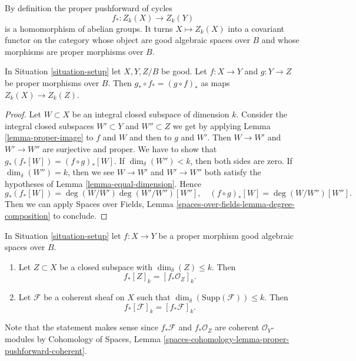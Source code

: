 \noindent
By definition the proper pushforward of cycles
$$
f_* : Z_k(X) \longrightarrow Z_k(Y)
$$
is a homomorphism of abelian groups. It turns $X \mapsto Z_k(X)$
into a covariant functor on the category whose object are good
algebraic spaces over $B$ and whose morphisms are proper morphisms
over $B$.

\begin{lemma}
\label{lemma-compose-pushforward}
In Situation \ref{situation-setup} let $X, Y, Z/B$ be good.
Let $f : X \to Y$ and $g : Y \to Z$ be proper morphisms over $B$.
Then $g_* \circ f_* = (g \circ f)_*$ as maps $Z_k(X) \to Z_k(Z)$.
\end{lemma}

\begin{proof}
Let $W \subset X$ be an integral closed subspace of dimension $k$.
Consider the integral closed subspaces
$W' \subset Y$ and $W'' \subset Z$
we get by applying Lemma \ref{lemma-proper-image}
to $f$ and $W$ and then to $g$ and $W'$.
Then $W \to W'$ and $W' \to W''$ are surjective and proper.
We have to show that $g_*(f_*[W]) = (f \circ g)_*[W]$.
If $\dim_\delta(W'') < k$, then both sides are zero.
If $\dim_\delta(W'') = k$, then we see $W \to W'$ and $W' \to W''$
both satisfy the hypotheses of Lemma \ref{lemma-equal-dimension}.
Hence
$$
g_*(f_*[W]) = \deg(W/W')\deg(W'/W'')[W''],
\quad
(f \circ g)_*[W] = \deg(W/W'')[W''].
$$
Then we can apply
Spaces over Fields, Lemma \ref{spaces-over-fields-lemma-degree-composition}
to conclude.
\end{proof}

\begin{lemma}
\label{lemma-cycle-push-sheaf}
In Situation \ref{situation-setup} let $f : X \to Y$ be a proper morphism
good algebraic spaces over $B$.
\begin{enumerate}
\item Let $Z \subset X$ be a closed subspace with $\dim_\delta(Z) \leq k$.
Then
$$
f_*[Z]_k = [f_*{\mathcal O}_Z]_k.
$$
\item Let $\mathcal{F}$ be a coherent sheaf on $X$ such that
$\dim_\delta(\text{Supp}(\mathcal{F})) \leq k$. Then
$$
f_*[\mathcal{F}]_k = [f_*{\mathcal F}]_k.
$$
\end{enumerate}
Note that the statement makes sense since $f_*\mathcal{F}$ and
$f_*\mathcal{O}_Z$ are coherent $\mathcal{O}_Y$-modules by
Cohomology of Spaces, Lemma
\ref{spaces-cohomology-lemma-proper-pushforward-coherent}.
\end{lemma}


